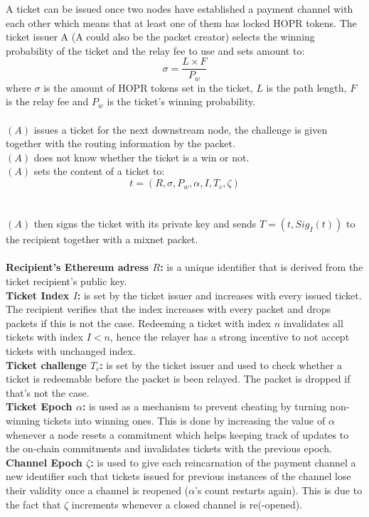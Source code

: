 A ticket can be issued once two nodes have established a payment channel with each other which means that at least one of them has locked HOPR tokens.
\newline The ticket issuer A (A could also be the packet creator) selects the winning probability of the ticket and the relay fee to use and sets amount to:
$$\sigma=\dfrac{L\times F}{P_w}$$
where $\sigma$ is the amount of HOPR tokens set in the ticket, $L$ is the path length, $F$ is the relay fee and $P_w$ is the ticket's winning probability.
\\~\\$(A)$ issues a ticket for the next downstream node,
the challenge is given together with the routing information by the packet.
\\$(A)$ does not know whether the ticket is a win or not.
    \\$(A)$ sets the content of a ticket to: $$t=(R,\sigma,P_w,\alpha,I,T_c,\zeta)$$
\\~\\$(A)$ then signs the ticket with its private key and sends $T= (t, Sig_I(t))$ to the recipient together with a mixnet packet.
    \\~\\\textbf{Recipient's Ethereum adress $R$:} is a unique identifier that is derived from the ticket recipient's public key.
    \\\textbf{Ticket Index $I$:} is set by the ticket issuer and increases with every issued ticket. The recipient verifies that the index increases with every packet and drops packets if this is not the case. Redeeming a ticket with index $n$ invalidates all tickets with index $I<n$, hence the relayer has a strong incentive to not accept tickets with unchanged index.
    \\\textbf{Ticket challenge $T_c$:}  is set by the ticket issuer and used to check whether a ticket is redeemable before the packet is been relayed. The packet is dropped if that's not the case.
    \\\textbf{Ticket Epoch $\alpha$:} is used as a mechanism to prevent cheating by turning non-winning tickets into winning ones. This is done by increasing the value of $\alpha$ whenever a node resets a commitment which helps keeping track of updates to the on-chain commitments and invalidates tickets with the previous epoch.
    \\\textbf{Channel Epoch $\zeta$:} is used to give each reincarnation of the payment channel a new identifier such that tickets issued for previous instances of the channel lose their validity once a channel is reopened ($\alpha$'s count restarts again). This is due to the fact that $\zeta$ increments whenever a closed channel is re(-opened).
